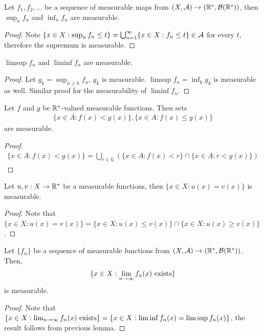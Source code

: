 \documentclass[11pt]{article}
\begin{document}
	\begin{proposition}
		Let $f_1, f_2, \dots$ be a sequence of measurable maps from $(X, \mathcal{{A}}) \to (\mathbb{R}^*, \mathcal{{B}}(\mathbb{R}^*))$, then $\sup_n f_n$ and $\inf_n f_n$ are measurable.
		\begin{proof}
			Note $\{x \in X : \sup_n f_n \leq t\} = \bigcup_{n=1}^\infty \{x \in X : f_n \leq t\} \in \mathcal{{A}}$ for every $t$, therefore the supremum is measurable.
		\end{proof}
	\end{proposition}
	
	\begin{corollary}
		$\limsup f_n$ and $\liminf f_n$ are measurable.
		\begin{proof}
			Let $g_k = \sup_{n \geq k} f_n$, $g_k$ is measurable. $\limsup f_n = \inf_k g_k$ is measurable as well. Similar proof for the measurability of $\liminf f_n$.
		\end{proof}
	\end{corollary}
	
	\begin{proposition}
		Let $f$ and $g$ be $\mathbb{R}^*$-valued measurable functions. Then sets
		\begin{align}
			\{x \in A: f(x)<g(x)\},\{x \in A: f(x) \leq g(x)\}
		\end{align}
		are measurable.
		\begin{proof}
			\begin{align}
				\{x \in A: f(x)<g(x)\}=\bigcup_{r \in \mathbb{Q}}(\{x \in A: f(x)<r\} \cap\{x \in A: r<g(x)\})
			\end{align}
		\end{proof}
	\end{proposition}
	
	\begin{corollary}
		Let $u, v: X \to \mathbb{R}^*$ be a measurable functions, then $\{x \in X : u(x) = v(x)\}$ is measurable.
		\begin{proof}
			Note that $\{x \in X : u(x) = v(x)\} = \{x \in X : u(x) \leq v(x)\} \cap \{x \in X : u(x) \geq v(x)\}$.
		\end{proof}
	\end{corollary}
	
	\begin{corollary}
		Let $\{f_n\}$ be a sequence of measurable functions from $(X, \mathcal{{A}}) \to (\mathbb{R}^*, \mathcal{{B}}(\mathbb{R}^*))$. Then,
		\begin{align}
			\{x \in X : \lim_{n \to \infty} f_n(x) \text{{ exists}}\}
		\end{align}
		is measurable.
		\begin{proof}
			Note that $\{x \in X : \lim_{n \to \infty} f_n(x) \text{{ exists}}\} = \{x \in X :  \liminf f_n(x) = \limsup f_n(x) \}$, the result follows from previous lemma.
		\end{proof}
	\end{corollary}
	
\end{document}
